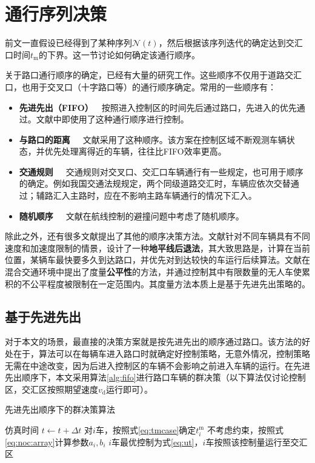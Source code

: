 \section{通行序列决策}
前文一直假设已经得到了某种序列$\mathcal{N}(t)$，然后根据该序列迭代的确定达到交汇口时间$t_\mathrm{m}$的下界。这一节讨论如何确定该通行顺序。

关于路口通行顺序的确定，已经有大量的研究工作。这些顺序不仅用于道路交汇口，也用于交叉口（十字路口等）的通行顺序确定。常用的一些顺序有：
\begin{itemize}
\item \textbf{先进先出（FIFO）}\ \ 按照进入控制区的时间先后通过路口，先进入的优先通过。文献\cite{Kim2013Collision,Azimi2011Vehicular}中即使用了这种通行顺序进行控制。
\item \textbf{与路口的距离}\ \ \ 文献\cite{Fankhauser2011Collision}采用了这种顺序。该方案在控制区域不断观测车辆状态，并优先处理离得近的车辆，往往比FIFO效率更高。
\item \textbf{交通规则}\ \ \ 交通规则对交叉口、交汇口车辆通行有一些规定，也可用于顺序的确定。例如我国交通法规规定，两个同级道路交汇时，车辆应依次交替通过；辅路汇入主路时，应在不影响主路车辆通行的情况下汇入。
\item \textbf{随机顺序}\ \ \ 文献\cite{Chaloulos2010Distributed}在航线控制的避撞问题中考虑了随机顺序。
\end{itemize}

除此之外，还有很多文献提出了其他的顺序决策方法。文献\cite{Campos2017Traffic}针对不同车辆具有不同速度和加速度限制的情景，设计了一种\textbf{地平线后退法}，其大致思路是，计算在当前位置，某辆车最快要多久到达路口，并优先对到达较快的车运行后续算法。文献\cite{Baselt2014Merging}在混合交通环境中提出了度量\textbf{公平性}的方法，并通过控制其中有限数量的无人车使累积的不公平程度被限制在一定范围内。其度量方法本质上是基于先进先出策略的。

\subsection{基于先进先出}
对于本文的场景，最直接的决策方案就是按先进先出的顺序通过路口。该方法的好处在于，算法可以在每辆车进入路口时就确定好控制策略，无意外情况，控制策略无需在中途改变，因为后进入控制区的车辆不会影响之前进入车辆的运行。在先进先出顺序下，本文采用算法\eqref{alg:fifo}进行路口车辆的群决策（以下算法仅讨论控制区，交汇区按照期望速度$v_\mathrm{d}$运行即可）。

\begin{algorithm}[htbp]
\caption{先进先出顺序下的群决策算法}
\label{alg:fifo}
\begin{algorithmic}
  \Statex
    \State 仿真时间 $t\gets t+\Delta t$
        \State 对$i$车，按照式\eqref{eq:tmcase}确定$t_i^\mathrm{m}$
        \State 不考虑约束，按照式\eqref{eq:noc:array}计算参数$a_i, b_i$
        \State $i$车最优控制为式\eqref{eq:ut}，$i$车按照该控制量运行至交汇区
      \EndFor
    \EndIf
  \EndWhile
\end{algorithmic}
\end{algorithm}

